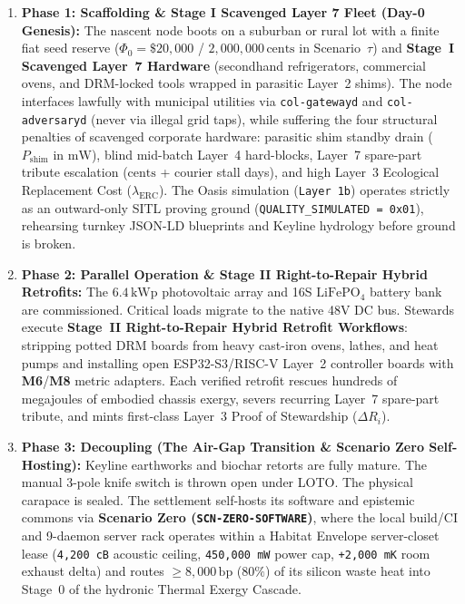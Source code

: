 \begin{enumerate}
    \item \textbf{Phase 1: Scaffolding \& Stage I Scavenged Layer 7 Fleet (Day-0 Genesis):}
    The nascent node boots on a suburban or rural lot with a finite fiat seed reserve ($\Phi_0 = \$20{,}000$ / $2{,}000{,}000\,\mathrm{cents}$ in Scenario~$\tau$) and \textbf{Stage~I Scavenged Layer~7 Hardware} (secondhand refrigerators, commercial ovens, and DRM-locked tools wrapped in parasitic Layer~2 shims). The node interfaces lawfully with municipal utilities via \texttt{col-gatewayd} and \texttt{col-adversaryd} (never via illegal grid taps), while suffering the four structural penalties of scavenged corporate hardware: parasitic shim standby drain ($P_{\mathrm{shim}}$ in $\mathrm{mW}$), blind mid-batch Layer~4 hard-blocks, Layer~7 spare-part tribute escalation ($\mathrm{cents}$ + courier stall days), and high Layer~3 Ecological Replacement Cost ($\lambda_{\mathrm{ERC}}$). The Oasis simulation (\texttt{Layer 1b}) operates strictly as an outward-only SITL proving ground (\texttt{QUALITY\_SIMULATED = 0x01}), rehearsing turnkey JSON-LD blueprints and Keyline hydrology before ground is broken.
    \item \textbf{Phase 2: Parallel Operation \& Stage II Right-to-Repair Hybrid Retrofits:}
    The $6.4\,\mathrm{kWp}$ photovoltaic array and 16S $\mathrm{LiFePO}_4$ battery bank are commissioned. Critical loads migrate to the native 48V DC bus. Stewards execute \textbf{Stage~II Right-to-Repair Hybrid Retrofit Workflows}: stripping potted DRM boards from heavy cast-iron ovens, lathes, and heat pumps and installing open ESP32-S3/RISC-V Layer~2 controller boards with \textbf{M6}/\textbf{M8} metric adapters. Each verified retrofit rescues hundreds of megajoules of embodied chassis exergy, severs recurring Layer~7 spare-part tribute, and mints first-class Layer~3 Proof of Stewardship ($\Delta R_i$).
    \item \textbf{Phase 3: Decoupling (The Air-Gap Transition \& Scenario Zero Self-Hosting):}
    Keyline earthworks and biochar retorts are fully mature. The manual 3-pole knife switch is thrown open under LOTO. The physical carapace is sealed. The settlement self-hosts its software and epistemic commons via \textbf{Scenario Zero (\texttt{SCN-ZERO-SOFTWARE})}, where the local build/CI and 9-daemon server rack operates within a Habitat Envelope server-closet lease (\texttt{4,200 cB} acoustic ceiling, \texttt{450,000 mW} power cap, \texttt{+2,000 mK} room exhaust delta) and routes $\ge 8{,}000\,\mathrm{bp}$ ($80\%$) of its silicon waste heat into Stage~0 of the hydronic Thermal Exergy Cascade.

\end{enumerate}
